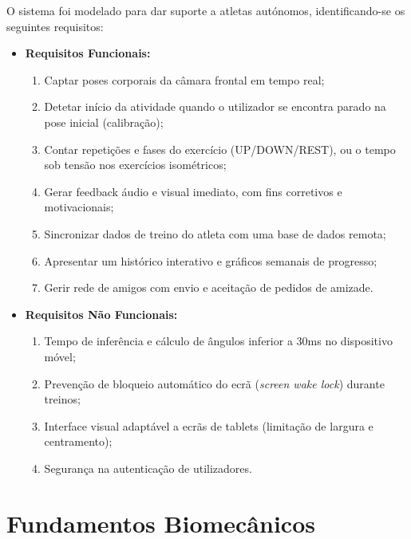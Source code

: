 O sistema foi modelado para dar suporte a atletas autónomos, identificando-se os seguintes requisitos:
\begin{itemize}
    \item \textbf{Requisitos Funcionais:}
    \begin{enumerate}
        \item Captar poses corporais da câmara frontal em tempo real;
        \item Detetar início da atividade quando o utilizador se encontra parado na pose inicial (calibração);
        \item Contar repetições e fases do exercício (UP/DOWN/REST), ou o tempo sob tensão nos exercícios isométricos;
        \item Gerar feedback áudio e visual imediato, com fins corretivos e motivacionais;       \item Sincronizar dados de treino do atleta com uma base de dados remota;
        \item Apresentar um histórico interativo e gráficos semanais de progresso;
        \item Gerir rede de amigos com envio e aceitação de pedidos de amizade.
    \end{enumerate}
    \item \textbf{Requisitos Não Funcionais:}
    \begin{enumerate}
        \item Tempo de inferência e cálculo de ângulos inferior a 30ms no dispositivo móvel;
        \item Prevenção de bloqueio automático do ecrã (\textit{screen wake lock}) durante treinos;
        \item Interface visual adaptável a ecrãs de tablets (limitação de largura e centramento);
        \item Segurança na autenticação de utilizadores.
    \end{enumerate}
\end{itemize}

\section{Fundamentos Biomecânicos}
\label{sec:fundamentos}

